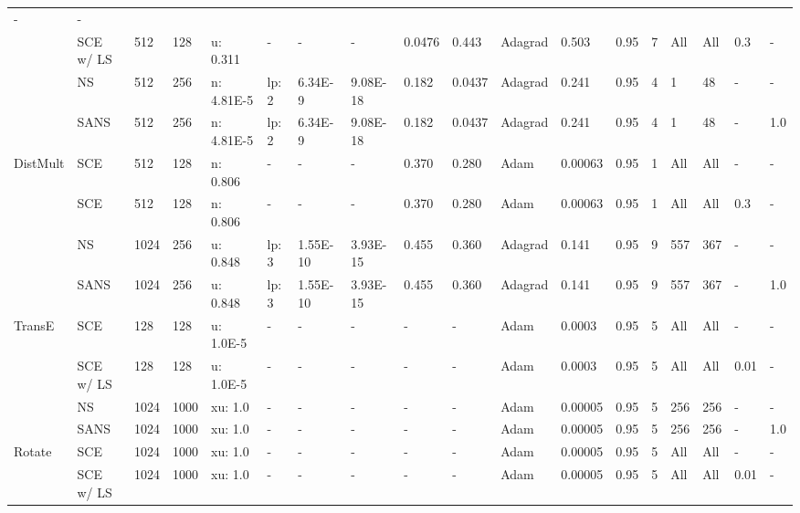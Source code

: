 \begin{table}[h!]
{\begin{tabular}{llllllllllllllllll}
  - &
  - \\
 &
  SCE w/ LS &
  512 &
  128 &
  u: 0.311 &
  - &
  - &
  - &
  0.0476 &
  0.443 &
  Adagrad &
  0.503 &
  0.95 &
  7 &
  All &
  All &
  0.3 &
  - \\
 &
  NS &
  512 &
  256 &
  n: 4.81E-5 &
  lp: 2 &
  6.34E-9 &
  9.08E-18 &
  0.182 &
  0.0437 &
  Adagrad &
  0.241 &
  0.95 &
  4 &
  1 &
  48 &
  - &
  - \\
 &
  SANS &
  512 &
  256 &
  n: 4.81E-5 &
  lp: 2 &
  6.34E-9 &
  9.08E-18 &
  0.182 &
  0.0437 &
  Adagrad &
  0.241 &
  0.95 &
  4 &
  1 &
  48 &
  - &
  1.0 \\
  \midrule
\multirow{4}{*}{DistMult} &
  SCE &
  512 &
  128 &
  n: 0.806 &
  - &
  - &
  - &
  0.370 &
  0.280 &
  Adam &
  0.00063 &
  0.95 &
  1 &
  All &
  All &
  - &
  - \\
 &
  SCE &
  512 &
  128 &
  n: 0.806 &
  - &
  - &
  - &
  0.370 &
  0.280 &
  Adam &
  0.00063 &
  0.95 &
  1 &
  All &
  All &
  0.3 &
  - \\
 &
  NS &
  1024 &
  256 &
  u: 0.848 &
  lp: 3 &
  1.55E-10 &
  3.93E-15 &
  0.455 &
  0.360 &
  Adagrad &
  0.141 &
  0.95 &
  9 &
  557 &
  367 &
  - &
  - \\
 &
  SANS &
  1024 &
  256 &
  u: 0.848 &
  lp: 3 &
  1.55E-10 &
  3.93E-15 &
  0.455 &
  0.360 &
  Adagrad &
  0.141 &
  0.95 &
  9 &
  557 &
  367 &
  - &
  1.0 \\
  \midrule
\multirow{4}{*}{TransE} &
  SCE &
  128 &
  128 &
  u: 1.0E-5 &
  - &
  - &
  - &
  - &
  - &
  Adam &
  0.0003 &
  0.95 &
  5 &
  All &
  All &
  - &
  - \\
 &
  SCE w/ LS &
  128 &
  128 &
  u: 1.0E-5 &
  - &
  - &
  - &
  - &
  - &
  Adam &
  0.0003 &
  0.95 &
  5 &
  All &
  All &
  0.01 &
  - \\
 &
  NS &
  1024 &
  1000 &
  xu: 1.0 &
  - &
  - &
  - &
  - &
  - &
  Adam &
  0.00005 &
  0.95 &
  5 &
  256 &
  256 &
  - &
  - \\
 &
  SANS &
  1024 &
  1000 &
  xu: 1.0 &
  - &
  - &
  - &
  - &
  - &
  Adam &
  0.00005 &
  0.95 &
  5 &
  256 &
  256 &
  - &
  1.0\\
  \midrule
\multirow{4}{*}{Rotate} &
  SCE &
  1024 &
  1000 &
  xu: 1.0 &
  - &
  - &
  - &
  - &
  - &
  Adam &
  0.00005 &
  0.95 &
  5 &
  All &
  All &
  - &
  - \\
 &
  SCE w/ LS &
  1024 &
  1000 &
  xu: 1.0 &
  - &
  - &
  - &
  - &
  - &
  Adam &
  0.00005 &
  0.95 &
  5 &
  All &
  All &
  0.01 &
  - \\

\end{tabular}}
\end{table}

